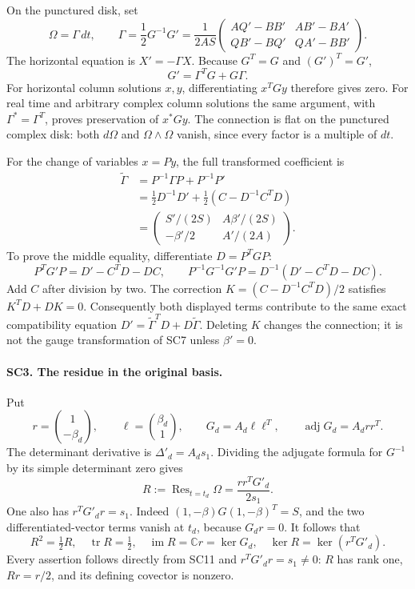 On the punctured disk, set
\[
 \Omega=\Gamma\,dt,\qquad
 \Gamma=\frac12G^{-1}G'
 =\frac1{2AS}
 \begin{pmatrix}
 A Q'-B B'&A B'-B A'\\
 Q B'-B Q'&Q A'-B B'
 \end{pmatrix}.
 \tag{SC7}
\]
The horizontal equation is \(X'=-\Gamma X\).
Because \(G^T=G\) and \((G')^T=G'\),
\[
 G'=\Gamma^TG+G\Gamma.
 \tag{SC8}
\]
For horizontal column solutions \(x,y\), differentiating
\(x^TGy\) therefore gives zero. For real time and arbitrary complex
column solutions the same argument, with \(\Gamma^*=\Gamma^T\),
proves preservation of \(x^*Gy\). The connection is flat on the
punctured complex disk: both \(d\Omega\) and
\(\Omega\wedge\Omega\) vanish, since every factor is a multiple
of \(dt\).

For the change of variables \(x=Py\), the full transformed
coefficient is
\[
 \begin{split}
 \widetilde\Gamma
 &=P^{-1}\Gamma P+P^{-1}P'\\
 &=\frac12D^{-1}D'+\frac12(C-D^{-1}C^TD)\\
 &=\begin{pmatrix}
       S'/(2S)&A\beta'/(2S)\\
       -\beta'/2&A'/(2A)
    \end{pmatrix}.
 \end{split}\tag{SC9}
\]
To prove the middle equality, differentiate \(D=P^TGP\):
\[
 P^TG'P=D'-C^TD-DC,\qquad
 P^{-1}G^{-1}G'P=D^{-1}(D'-C^TD-DC).
\]
Add \(C\) after division by two. The correction
\(K=(C-D^{-1}C^TD)/2\) satisfies \(K^TD+DK=0\).
Consequently both displayed terms contribute to the same exact
compatibility equation \(D'=\widetilde\Gamma^TD+
D\widetilde\Gamma\). Deleting \(K\) changes the connection; it
is not the gauge transformation of SC7 unless \(\beta'=0\).

\paragraph{SC3. The residue in the original basis.}
Put
\[
 r=\binom{1}{-\beta_d},\qquad
 \ell=\binom{\beta_d}{1},\qquad
 G_d=A_d\ell\ell^T,\qquad
 \operatorname{adj}G_d=A_drr^T .
 \tag{SC10}
\]
The determinant derivative is \(\Delta'_d=A_ds_1\).
Dividing the adjugate formula for \(G^{-1}\) by its simple
determinant zero gives
\[
 R:=\operatorname{Res}_{t=t_d}\Omega
   =\frac{r r^TG'_d}{2s_1}.
 \tag{SC11}
\]
One also has \(r^TG'_dr=s_1\). Indeed
\((1,-\beta)G(1,-\beta)^T=S\), and the two differentiated-vector
terms vanish at \(t_d\), because \(G_dr=0\). It follows that
\[
 R^2=\tfrac12R,\quad
 \operatorname{tr}R=\tfrac12,\quad
 \operatorname{im}R=\mathbb Cr=\ker G_d,\quad
 \ker R=\ker(r^TG'_d).
 \tag{SC12}
\]
Every assertion follows directly from SC11 and
\(r^TG'_dr=s_1\ne0\): \(R\) has rank one, \(Rr=r/2\),
and its defining covector is nonzero.

